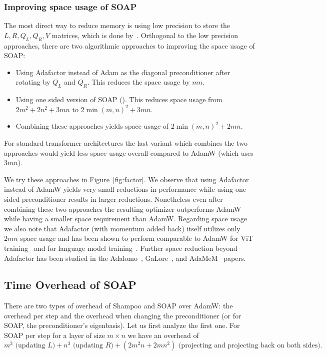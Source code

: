 \documentclass{article} %
\begin{document}
\subsubsection{Improving space usage of SOAP}
\label{app:impr-space}


The most direct way to reduce memory is using low precision to store the $L, R, Q_L, Q_R, V$ matrices, which is done by~\citet{8bitadam,4bitshampoo}. Orthogonal to the low precision approaches, there are two algorithmic approaches to improving the space usage of SOAP: 
\begin{itemize}
	\item Using Adafactor instead of Adam as the diagonal preconditioner after rotating by $Q_L$ and $Q_R$. This reduces the space usage by $mn$.
	\item Using one sided version of SOAP (). This reduces space usage from $2m^2+2n^2+3mn$ to $2 \min(m,n)^2 + 3mn$.
	\item Combining these approaches yields space usage of $2 \min(m,n)^2 + 2mn$.
\end{itemize} 
For standard transformer architectures the last variant which combines the two approaches would yield less space usage overall compared to AdamW (which uses $3mn$).

We try these approaches in Figure~\ref{fig:factor}. We observe that using Adafactor instead of AdamW yields very small reductions in performance while using one-sided preconditioner results in larger reductions. Nonetheless even after combining these two approaches the resulting optimizer outperforms AdamW while having a smaller space requirement than AdamW. Regarding space usage we also note that Adafactor (with momentum added back) itself utilizes only $2mn$ space usage and has been shown to perform comparable to AdamW for ViT training~\citep{zhai} and for language model training~\citep{zhaoscience}. Further space reduction beyond Adafactor has been studied in the Adalomo~\citep{adalomo}, GaLore~\citep{galore}, and AdaMeM~\citep{adamem} papers.




\subsection{Time Overhead of SOAP}
\label{app:theory-overhead}
There are two types of overhead of Shampoo and SOAP over AdamW: the overhead per step and the overhead when changing the preconditioner (or for SOAP, the preconditioner's eigenbasis). Let us first analyze the first one. For SOAP per step for a layer of size $m \times n$ we have an overhead of $$m^3\text{ (updating $L$)}+n^3\text{ (updating $R$)}+(2m^2n+2mn^2)\text{ (projecting and projecting back on both sides)}.$$
\end{document}
